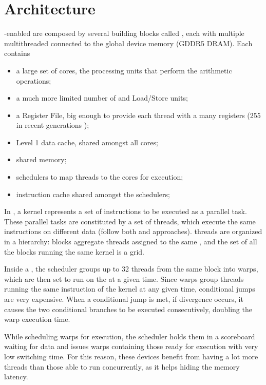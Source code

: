 \documentclass[../thesis]{subfiles}
\begin{document}
	\section{Architecture}
	\label{sec:cuda:arch}
	
	\cuda-enabled \gpus are composed by several building blocks called \gpcs, each with multiple multithreaded \sms connected to the global device memory (GDDR5 DRAM). Each \sm contains
	\begin{itemize}
		\item a large set of \cuda cores, the processing units that perform the arithmetic operations;
		\item a much more limited number of \sfus and Load/Store units;
		\item a Register File, big enough to provide each thread with a many registers (255 in recent generations \cite{NVIDIA:KEPLER});
		\item Level 1 data cache, shared amongst all cores;
		\item shared memory;
		\item schedulers to map threads to the cores for execution;
		\item instruction cache shared amongst the schedulers;
	\end{itemize}

	In \cuda, a kernel represents a set of instructions to be executed as a parallel task. These parallel tasks are constituted by a set of \cuda threads, which execute the same instructions on different data (follow both \simd and \simt approaches). \cuda threads are organized in a hierarchy: blocks aggregate threads assigned to the same \sm, and the set of all the blocks running the same kernel is a grid.

	Inside a \sm, the scheduler groups up to 32 threads from the same block into warps, which are then set to run on the \sm at a given time. Since warps group threads running the same instruction of the kernel at any given time, conditional jumps are very expensive. When a conditional jump is met, if divergence occurs, it causes the two conditional branches to be executed consecutively, doubling the warp execution time.

	While scheduling warps for execution, the scheduler holds them in a scoreboard waiting for data and issues warps containing those ready for execution with very low switching time. For this reason, these devices benefit from having a lot more threads than those able to run concurrently, as it helps hiding the memory latency.
\end{document}
